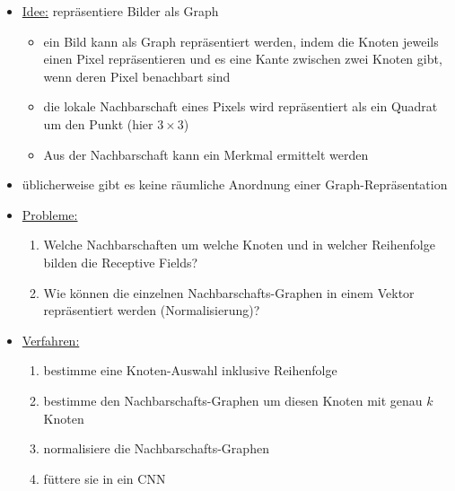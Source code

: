 \begin{itemize}
  \item \underline{Idee:} repräsentiere Bilder als Graph
    \begin{itemize}
      \item ein Bild kann als Graph repräsentiert werden, indem die Knoten jeweils einen Pixel repräsentieren und es eine Kante zwischen zwei Knoten gibt, wenn deren Pixel benachbart sind
      \item die lokale Nachbarschaft eines Pixels wird repräsentiert als ein Quadrat um den Punkt (hier $3 \times 3$)
      \item Aus der Nachbarschaft kann ein Merkmal ermittelt werden
    \end{itemize}
  \item üblicherweise gibt es keine räumliche Anordnung einer Graph-Repräsentation
  \item \underline{Probleme:}
    \begin{enumerate}
      \item Welche Nachbarschaften um welche Knoten und in welcher Reihenfolge bilden die Receptive Fields?
      \item Wie können die einzelnen Nachbarschafts-Graphen in einem Vektor repräsentiert werden (Normalisierung)?
    \end{enumerate}
  \item \underline{Verfahren:}
    \begin{enumerate}
      \item bestimme eine Knoten-Auswahl inklusive Reihenfolge
      \item bestimme den Nachbarschafts-Graphen um diesen Knoten mit genau $k$ Knoten
      \item normalisiere die Nachbarschafts-Graphen
      \item füttere sie in ein CNN
    \end{enumerate}
\end{itemize}
